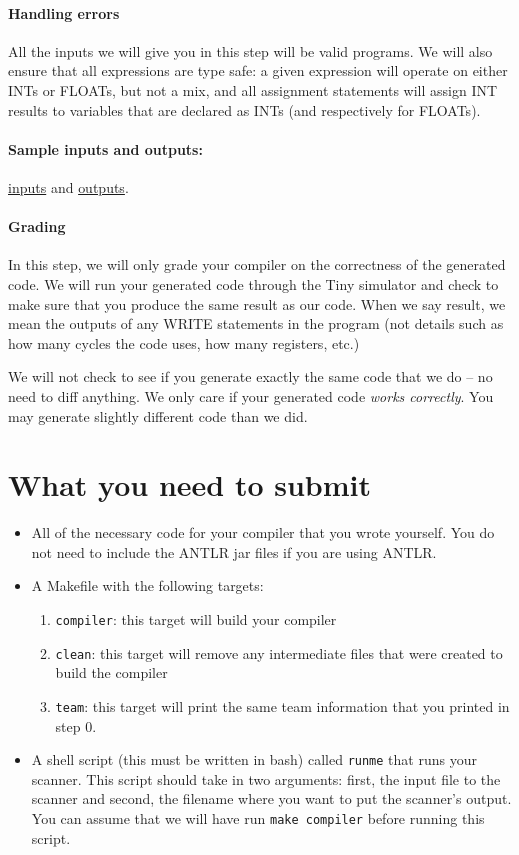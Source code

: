\documentclass{article}
\begin{document}
\paragraph{Handling errors}
All the inputs we will give you in this step will be valid programs. We will also ensure that all expressions are type safe: a given expression will operate on either INTs or FLOATs, but not a mix, and all assignment statements will assign INT results to variables that are declared as INTs (and respectively for FLOATs).

\paragraph{Sample inputs and outputs:} \href{https://hegden.github.io/cs406/homeworks/PA5/input.zip}{inputs} and \href{https://hegden.github.io/cs406/homeworks/PA5/output.zip}{outputs}.

\paragraph{Grading}
In this step, we will only grade your compiler on the correctness of the generated code. We will run your generated code through the Tiny simulator and check to make sure that you produce the same result as our code. When we say result, we mean the outputs of any WRITE statements in the program (not details such as how many cycles the code uses, how many registers, etc.)

We will not check to see if you generate exactly the same code that we do -- no need to diff anything. We only care if your generated code {\em works correctly}. You may generate slightly different code than we did.

\section{What you need to submit}
\begin{itemize}
	\item All of the necessary code for your compiler that you wrote yourself. You do not need to include the ANTLR jar files if you are using ANTLR.
	\item A Makefile with the following targets:
		\begin{enumerate}
			\item \texttt{compiler}: this target will build your compiler
			\item \texttt{clean}: this target will remove any intermediate files that were created to build the compiler
			\item \texttt{team}: this target will print the same team information that you printed in step 0.
		\end{enumerate}

	\item A shell script (this must be written in bash) called \texttt{runme} that runs your scanner. This script should take in two arguments: first, the input file to the scanner and second, the filename where you want to put the scanner's output. You can assume that we will have run \texttt{make compiler} before running this script.
\end{itemize}
	
\end{document}
